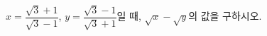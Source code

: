 $x=\dfrac{\sqrt{3}+1}{\sqrt{3}-1}$, $y=\dfrac{\sqrt{3}-1}{\sqrt{3}+1}$일 때, $\sqrt{x}-\sqrt{y}$의 값을 구하시오.
